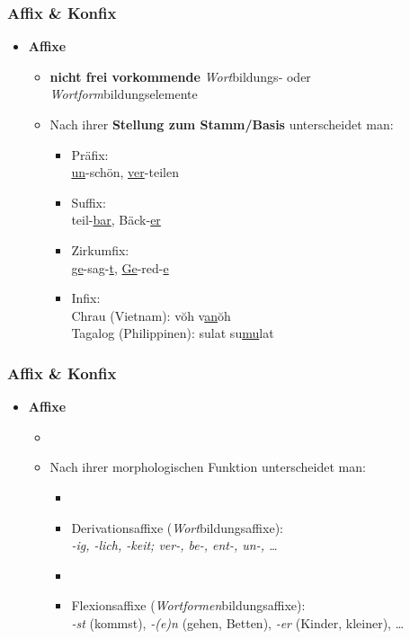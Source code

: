 \begin{frame}
\frametitle{Affix \& Konfix}

\begin{itemize}
	\item \textbf{Affixe}
	
	\begin{itemize}
		\item \textbf{nicht frei vorkommende} \emph{Wort}bildungs- oder \emph{Wortform}bildungselemente
		\item Nach ihrer \textbf{Stellung zum Stamm/Basis} unterscheidet man:
		
		\begin{itemize}
			\item Präfix: \\
			\underline{un}-schön, \underline{ver}-teilen
			\item Suffix: \\
			teil-\underline{bar}, Bäck-\underline{er}
			\item Zirkumfix: \\
			\underline{ge}-sag-\underline{t}, \underline{Ge}-red-\underline{e}
			\item Infix: \\
			Chrau (Vietnam): v\u{o}h  \ras v\underline{an}\u{o}h  \\
			Tagalog (Philippinen): sulat  \ras su\underline{mu}lat 
		\end{itemize}
	\end{itemize}
\end{itemize}


\end{frame}


\begin{frame}
\frametitle{Affix \& Konfix}

\begin{itemize}
	\item \textbf{Affixe}
	
	\begin{itemize}
		\item[]
		\item Nach ihrer morphologischen Funktion unterscheidet man:
		
		\begin{itemize}
			\item[]
			\item Derivationsaffixe (\emph{Wort}bildungsaffixe): \\
			\emph{-ig, -lich, -keit; ver-, be-, ent-, un-, \dots}
			\item[]
			\item Flexionsaffixe (\emph{Wortformen}bildungsaffixe): \\
			\emph{-st} (kommst), \emph{-(e)n} (gehen, Betten), \emph{-er} (Kinder, kleiner), \dots
		\end{itemize}
	\end{itemize}
\end{itemize}


\end{frame}




